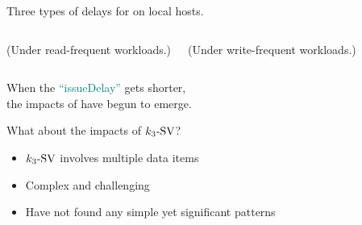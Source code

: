 \begin{frame}{}
  \centerline{Three types of delays for  on local hosts.}
  \begin{center}
    
  \end{center}

  
\end{frame}

\begin{frame}{}
  \begin{columns}
      \vspace{-0.40cm}
      \centerline{\footnotesize (Under read-frequent workloads.)}
      \vspace{-0.40cm}
      \centerline{\footnotesize (Under write-frequent workloads.)}
  \end{columns}

  \vspace{0.40cm}
  \begin{center}
    When the \textcolor{teal}{``issueDelay''} gets shorter, \\
    the impacts of \red{$\konebv$} have begun to emerge.
  \end{center}
\end{frame}

\begin{frame}{}
  What about the impacts of $k_3\text{-SV}$?
  \begin{itemize}
    \item $k_3\text{-SV}$ involves multiple data items
    \item Complex and challenging
    \item Have not found any simple yet significant patterns
  \end{itemize}

% 
\end{frame}
